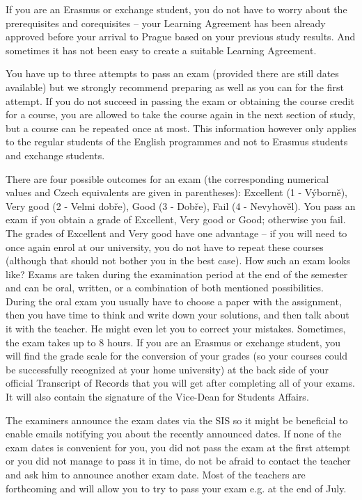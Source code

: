 If you are an Erasmus or exchange student, you do not have to worry about the
prerequisites and corequisites -- your Learning Agreement has been already
approved before your arrival to Prague based on your previous study results. And
sometimes it has not been easy to create a suitable Learning Agreement.

You have up to three attempts to pass an exam (provided there are still dates
available) but we strongly recommend preparing as well as you can for the first
attempt. If you do not succeed in passing the exam or obtaining the course
credit for a course, you are allowed to take the course again in the next
section of study, but a course can be repeated once at most. This information
however only applies to the regular students of the English programmes and not
to Erasmus students and exchange students.

There are four possible outcomes for an exam (the corresponding numerical values
and Czech equivalents are given in parentheses): Excellent (1 - Výborně), Very
good (2 - Velmi dobře), Good (3 - Dobře), Fail (4 - Nevyhověl). You pass an exam
if you obtain a grade of Excellent, Very good or Good; otherwise you fail.
The grades of Excellent and Very good have one advantage -- if you will need to
once again enrol at our university, you do not have to repeat these courses
(although that should not bother you in the best case).
How such an exam looks like? Exams are taken during the examination period at
the end of the semester and can be oral, written, or a combination of both
mentioned possibilities.
During the oral exam you usually have to choose a paper with the assignment,
then you have time to think and write down your solutions, and then talk about
it with the teacher. He might even let you to correct your mistakes. Sometimes,
the exam takes up to 8 hours.
If you are an Erasmus or exchange student, you will find the grade scale for the
conversion of your grades (so your courses could be successfully recognized at
your home university) at the back side of your official Transcript of Records
that you will get after completing all of your exams. It will also contain the
signature of the Vice-Dean for Students Affairs.

The examiners announce the exam dates via the SIS so it might be beneficial to
enable emails notifying you about the recently announced dates.
If none of the exam dates is convenient for you, you did not pass the exam at
the first attempt or you did not manage to pass it in time, do not be afraid to
contact the teacher and ask him to announce another exam date.
Most of the teachers are forthcoming and will allow you to try to pass your exam
e.g. at the end of July.

